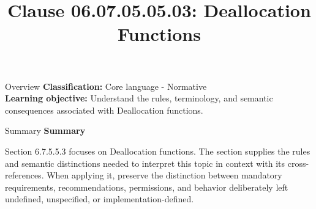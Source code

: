 \documentclass[10pt,letterpaper]{article}
\title{Clause 06.07.05.05.03: Deallocation Functions}
\author{}
\date{}
\begin{document}
\maketitle
\begin{CornellOverviewBox}{Overview}
\textbf{Classification:} Core language - Normative\\[2pt]
\textbf{Learning objective:} Understand the rules, terminology, and semantic consequences associated with Deallocation functions.
\end{CornellOverviewBox}\begin{CornellSummaryBox}{Summary}
{\sffamily\bfseries\color{Accent} Summary}\par\vspace{3pt}Section 6.7.5.5.3 focuses on Deallocation functions. The section supplies the rules and semantic distinctions needed to interpret this topic in context with its cross-references. When applying it, preserve the distinction between mandatory requirements, recommendations, permissions, and behavior deliberately left undefined, unspecified, or implementation-defined.
\end{CornellSummaryBox}
\end{document}
